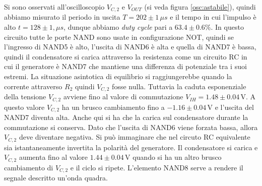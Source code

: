 \documentclass[10pt,a4paper]{article}
\begin{document}
Si sono osservati all'oscilloscopio $V_{C,2}$ e $V_{OUT}$ (si veda figura \ref{osc:astabile}), quindi abbiamo misurato il periodo in uscita $T= 202\pm1\,\mu s $ e il tempo in cui l'impulso è alto $t= 128\pm1,\mu s $, dunque  abbiamo \emph{duty cycle} pari a $63.4\pm0.6\%$. In questo circuito tutte le porte NAND sono usate in configurazione NOT, quindi se l'ingresso di NAND5 è alto, l'uscita di NAND6 è alta e quella di NAND7 è bassa, quindi il condensatore si carica attraverso la resistenza come un circuito RC in cui il generatore è NAND7 che mantiene una differenza di potenziale tra i suoi estremi. La situazione asintotica di equilibrio si raggiungerebbe quando la corrente attraverso $R_2$ quindi $V_{C,2}$ fosse nulla. Tuttavia la caduta esponenziale della tensione $V_{C,2}$ avviene fino al valore di commutazione $V_{IH}=1.48\pm0.04\,\text{V}$. A questo valore $V_{C,2}$ ha un brusco cambiamento fino a $-1.16\pm0.04 \,\text{V}$ e l'uscita del NAND7 diventa alta. Anche qui si ha che la carica sul condensatore durante la commutazione si conserva. Dato che l'uscita di NAND6 viene forzata bassa, allora $V_{C,2}$ deve diventare negativa. Si può immaginare che nel circuto RC equivalente sia istantaneamente invertita la polarità del generatore. Il condensatore si carica e $V_{C,2}$ aumenta fino al valore $1.44\pm0.04\,\text{V}$ quando si ha un altro brusco cambiamento di $V_{C,2}$ e il ciclo si ripete. L'elemento NAND8 serve a rendere il segnale descritto un'onda quadra.

\end{document}
